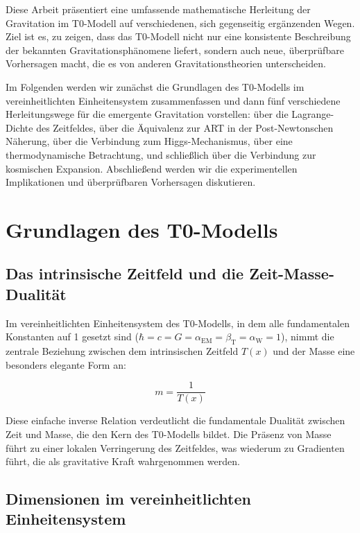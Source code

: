 \documentclass[12pt,a4paper]{article}
\newcommand{\Tfield}{T(x)}
\newcommand{\betaT}{\beta_{\text{T}}}
\newcommand{\alphaEM}{\alpha_{\text{EM}}}
\newcommand{\alphaW}{\alpha_{\text{W}}}
\begin{document}
	Diese Arbeit präsentiert eine umfassende mathematische Herleitung der Gravitation im T0-Modell auf verschiedenen, sich gegenseitig ergänzenden Wegen. Ziel ist es, zu zeigen, dass das T0-Modell nicht nur eine konsistente Beschreibung der bekannten Gravitationsphänomene liefert, sondern auch neue, überprüfbare Vorhersagen macht, die es von anderen Gravitationstheorien unterscheiden.
	
	Im Folgenden werden wir zunächst die Grundlagen des T0-Modells im vereinheitlichten Einheitensystem zusammenfassen und dann fünf verschiedene Herleitungswege für die emergente Gravitation vorstellen: über die Lagrange-Dichte des Zeitfeldes, über die Äquivalenz zur ART in der Post-Newtonschen Näherung, über die Verbindung zum Higgs-Mechanismus, über eine thermodynamische Betrachtung, und schließlich über die Verbindung zur kosmischen Expansion. Abschließend werden wir die experimentellen Implikationen und überprüfbaren Vorhersagen diskutieren.
	
	\section{Grundlagen des T0-Modells}
	
	\subsection{Das intrinsische Zeitfeld und die Zeit-Masse-Dualität}
	
	Im vereinheitlichten Einheitensystem des T0-Modells, in dem alle fundamentalen Konstanten auf 1 gesetzt sind (\(\hbar = c = G = \alphaEM = \betaT = \alphaW = 1\)), nimmt die zentrale Beziehung zwischen dem intrinsischen Zeitfeld \(\Tfield\) und der Masse eine besonders elegante Form an:
	
	\begin{equation}
		m = \frac{1}{\Tfield}
	\end{equation}
	
	Diese einfache inverse Relation verdeutlicht die fundamentale Dualität zwischen Zeit und Masse, die den Kern des T0-Modells bildet. Die Präsenz von Masse führt zu einer lokalen Verringerung des Zeitfeldes, was wiederum zu Gradienten führt, die als gravitative Kraft wahrgenommen werden.
	
	\subsection{Dimensionen im vereinheitlichten Einheitensystem}
	
\end{document}
